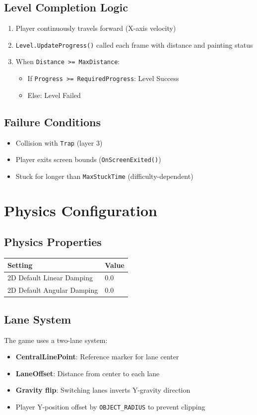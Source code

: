 \documentclass{report}
\begin{document}
\section{Level Completion Logic}
\begin{enumerate}
	\item Player continuously travels forward (X-axis velocity)
	\item \texttt{Level.UpdateProgress()} called each frame with distance and painting status
	\item When \texttt{Distance >= MaxDistance}:
	      \begin{itemize}
		      \item If \texttt{Progress >= RequiredProgress}: Level Success
		      \item Else: Level Failed
	      \end{itemize}
\end{enumerate}

\section{Failure Conditions}
\begin{itemize}[noitemsep]
	\item Collision with \texttt{Trap} (layer 3)
	\item Player exits screen bounds (\texttt{OnScreenExited()})
	\item Stuck for longer than \texttt{MaxStuckTime} (difficulty-dependent)
\end{itemize}

\chapter{Physics Configuration}
\section{Physics Properties}
\begin{longtable}{|l|l|}
	\hline
	\textbf{Setting}           & \textbf{Value} \\
	\hline
	2D Default Linear Damping  & 0.0            \\
	\hline
	2D Default Angular Damping & 0.0            \\
	\hline
\end{longtable}

\section{Lane System}
The game uses a two-lane system:
\begin{itemize}[noitemsep]
	\item \textbf{CentralLinePoint}: Reference marker for lane center
	\item \textbf{LaneOffset}: Distance from center to each lane
	\item \textbf{Gravity flip}: Switching lanes inverts Y-gravity direction
	\item Player Y-position offset by \texttt{OBJECT\_RADIUS} to prevent clipping
\end{itemize}
\end{document}
